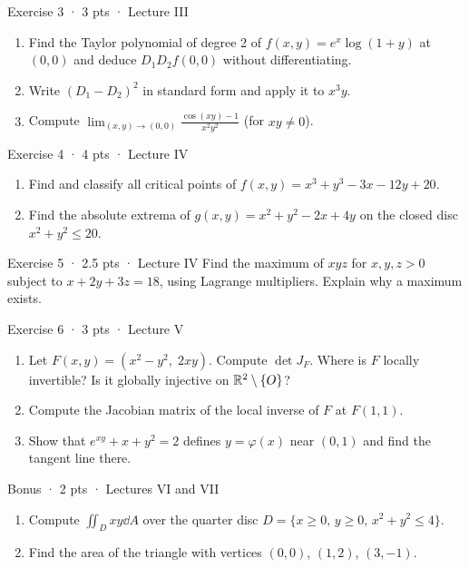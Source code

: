 \begin{problem}{Exercise 3 · 3 pts · Lecture III}
\begin{enumerate}[label=(\alph*)]
  \item Find the Taylor polynomial of degree 2 of $f(x,y)=e^x\log(1+y)$ at $(0,0)$ and deduce
  $D_1D_2f(0,0)$ without differentiating.
  \item Write $(D_1-D_2)^2$ in standard form and apply it to $x^3y$.
  \item Compute $\displaystyle\lim_{(x,y)\to(0,0)}\frac{\cos(xy)-1}{x^2y^2}$ (for $xy\ne0$).
\end{enumerate}
\end{problem}

\begin{problem}{Exercise 4 · 4 pts · Lecture IV}
\begin{enumerate}[label=(\alph*)]
  \item Find and classify all critical points of $f(x,y)=x^3+y^3-3x-12y+20$.
  \item Find the absolute extrema of $g(x,y)=x^2+y^2-2x+4y$ on the closed disc $x^2+y^2\le20$.
\end{enumerate}
\end{problem}

\begin{problem}{Exercise 5 · 2.5 pts · Lecture IV}
Find the maximum of $xyz$ for $x,y,z>0$ subject to $x+2y+3z=18$, using Lagrange multipliers.
Explain why a maximum exists.
\end{problem}

\begin{problem}{Exercise 6 · 3 pts · Lecture V}
\begin{enumerate}[label=(\alph*)]
  \item Let $F(x,y)=(x^2-y^2,\;2xy)$. Compute $\det J_F$. Where is $F$ locally invertible? Is it
  globally injective on $\mathbb{R}^2\setminus\{O\}$?
  \item Compute the Jacobian matrix of the local inverse of $F$ at $F(1,1)$.
  \item Show that $e^{xy}+x+y^2=2$ defines $y=\varphi(x)$ near $(0,1)$ and find the tangent line there.
\end{enumerate}
\end{problem}

\begin{problem}{Bonus · 2 pts · Lectures VI and VII}
\begin{enumerate}[label=(\alph*)]
  \item Compute $\iint_D xy\dd A$ over the quarter disc $D=\{x\ge0,\,y\ge0,\,x^2+y^2\le4\}$.
  \item Find the area of the triangle with vertices $(0,0)$, $(1,2)$, $(3,-1)$.
\end{enumerate}
\end{problem}


